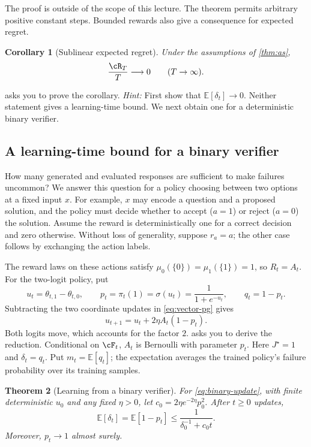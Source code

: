 \documentclass[11pt,twoside]{article}
\newcommand{\E}{\mathbb E}
\newtheorem{theorem}{Theorem}[section]
\newtheorem{corollary}[theorem]{Corollary}
\theoremstyle{definition}
\theoremstyle{remark}
\begin{document}
The proof is outside of the scope of this lecture. The theorem permits arbitrary positive
constant steps. Bounded rewards also give a consequence for expected regret.

\begin{corollary}[Sublinear expected regret]
\label{cor:sublinear-regret}
Under the assumptions of \cref{thm:as},
\[
 \frac{\cR_T}{T}\longrightarrow0\qquad(T\to\infty).
\]
\end{corollary}

 asks you to prove the corollary.
\emph{Hint:} First show that $\E[\delta_t]\to0$.
Neither statement gives a learning-time bound. We next obtain one for a
deterministic binary verifier.

\subsection{A learning-time bound for a binary verifier}
\label{sec:binary}

How many generated and evaluated responses are sufficient to make failures
uncommon? We answer this question for a policy choosing between two options
at a fixed input $x$. For example, $x$ may encode a question and a proposed
solution, and the policy must decide whether to accept ($a=1$) or reject
($a=0$) the solution. Assume the reward is deterministically one for a
correct decision and zero otherwise. Without loss of generality, suppose
$r_a=a$; the other case follows by exchanging the action labels.

The reward laws on these actions satisfy
$\mu_0(\{0\})=\mu_1(\{1\})=1$, so $R_t=A_t$.
For the two-logit policy, put
\[
 u_t=\theta_{t,1}-\theta_{t,0},\qquad
 p_t=\pi_t(1)=\sigma(u_t)=\frac1{1+e^{-u_t}},\qquad q_t=1-p_t.
\]
Subtracting the two coordinate updates in \cref{eq:vector-pg} gives
\begin{equation}
 u_{t+1}=u_t+2\eta A_t(1-p_t).
 \label{eq:binary-update}
\end{equation}
Both logits move, which accounts for the factor $2$.
 asks you to derive the reduction.
Conditional on $\cF_t$, $A_t$ is Bernoulli with parameter $p_t$.
Here $J^\star=1$ and $\delta_t=q_t$. Put $m_t=\E[q_t]$; the expectation
averages the trained policy's failure probability over its training samples.

\begin{theorem}[Learning from a binary verifier]
\label{thm:binary}
For \cref{eq:binary-update}, with finite deterministic $u_0$ and any fixed
$\eta>0$, let $c_0=2\eta e^{-2\eta}p_0^2$. After $t\ge0$ updates,
\begin{equation}
 \E[\delta_t]=\E[1-p_t]
 \le\frac{1}{\delta_0^{-1}+c_0t}.
 \label{eq:binary-rate}
\end{equation}
Moreover, $p_t\to1$ almost surely.
\end{theorem}
\end{document}
